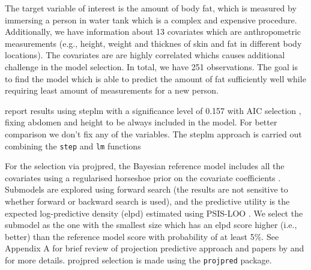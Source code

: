 \documentclass[american,]{article}
\theoremstyle{definition}
\begin{document}
The target variable of interest is the amount of body fat, which is
measured by immersing a person in water tank which is a complex and
expensive procedure. Additionally, we have information about 13
covariates which are anthropometric measurements (e.g., height, weight
and thicknes of skin and fat in different body locations). The
covariates are are highly correlated whichs causes additional
challenge in the model selection. In total, we have 251
observations. The goal is to find the model which is able to predict
the amount of fat sufficiently well while requiring least amount of
measurements for a new person.

\cite{paper:bodyfat} report results using steplm with a significance
level of 0.157 with AIC selection \citep{akaike1974new}, fixing
abdomen and height to be always included in the model. For better
comparison we don't fix any of the variables.  The steplm approach is
carried out combining the \texttt{step} and \texttt{lm} functions

For the selection via projpred, the Bayesian reference model includes
all the covariates using a regularised horseshoe prior on the
covariate coefficients \citep{paper:rhs}. Submodels are explored using
forward search (the results are not sensitive to whether forward or
backward search is used), and the predictive utility is the expected
log-predictive density (elpd) estimated using PSIS-LOO
\citep{paper:psis_loo}.  We select the submodel as the one with the
smallest size which has an elpd score higher (i.e., better) than the
reference model score with probability of at least 5\%. See Appendix A
for brief review of projection predictive approach and papers by
\citet{paper:model_selection} and \citet{paper:projpred} for more
details. projpred selection is made using the \texttt{projpred} package.
\end{document}
